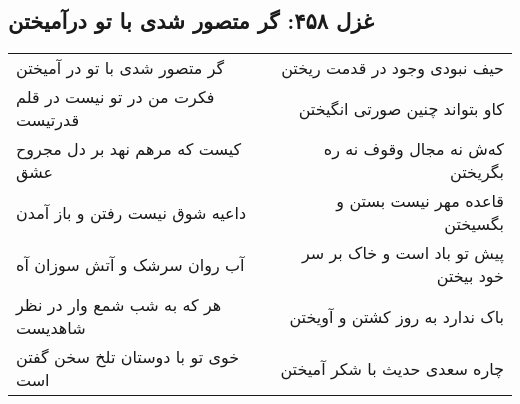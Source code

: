 \begin{center}
\section*{غزل ۴۵۸: گر متصور شدی با تو درآمیختن}
\label{sec:458}
\begin{longtable}{l p{0.5cm} r}
گر متصور شدی با تو در آمیختن
&&
حیف نبودی وجود در قدمت ریختن
\\
فکرت من در تو نیست در قلم قدرتیست
&&
کاو بتواند چنین صورتی انگیختن
\\
کیست که مرهم نهد بر دل مجروح عشق
&&
که‌ش نه مجال وقوف نه ره بگریختن
\\
داعیه شوق نیست رفتن و باز آمدن
&&
قاعده مهر نیست بستن و بگسیختن
\\
آب روان سرشک و آتش سوزان آه
&&
پیش تو باد است و خاک بر سر خود بیختن
\\
هر که به شب شمع وار در نظر شاهدیست
&&
باک ندارد به روز کشتن و آویختن
\\
خوی تو با دوستان تلخ سخن گفتن است
&&
چاره سعدی حدیث با شکر آمیختن
\\
\end{longtable}
\end{center}
